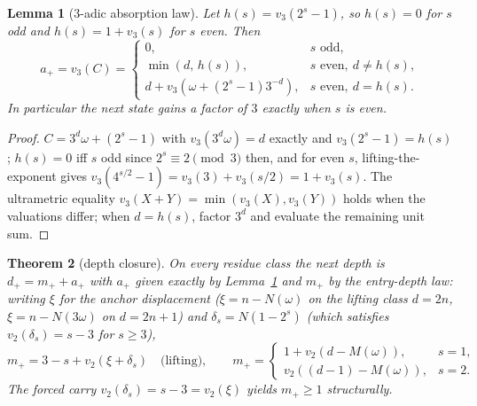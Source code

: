 \documentclass[11pt]{article}
\newtheorem{theorem}{Theorem}[section]
\newtheorem{lemma}[theorem]{Lemma}
\theoremstyle{remark}
\newcommand{\vt}[1]{v_2\!\left(#1\right)}
\newcommand{\vth}[1]{v_3\!\left(#1\right)}
\newcommand{\w}{\omega}
\newcommand{\dnext}{d_{+}}
\begin{document}
\begin{lemma}[$3$-adic absorption law]\label{lem:absorption}
Let $h(s) = \vth{2^s - 1}$, so $h(s) = 0$ for $s$ odd and $h(s) = 1 + \vth{s}$ for $s$ even. Then
\[ a_+ = \vth{C} = \begin{cases} 0, & s \text{ odd},\\[2pt] \min(d,\, h(s)), & s \text{ even},\ d \ne h(s),\\[2pt] d + \vth{\w + (2^s-1)3^{-d}}, & s \text{ even},\ d = h(s). \end{cases} \]
In particular the next state gains a factor of $3$ exactly when $s$ is even.
\end{lemma}

\begin{proof}
$C = 3^d\w + (2^s - 1)$ with $\vth{3^d\w} = d$ exactly and $\vth{2^s-1} = h(s)$; $h(s) = 0$ iff $s$ odd since $2^s \equiv 2 \pmod 3$ then, and for even $s$, lifting-the-exponent gives $\vth{4^{s/2}-1} = \vth{3} + \vth{s/2} = 1 + \vth{s}$. The ultrametric equality $\vth{X+Y} = \min(\vth X,\vth Y)$ holds when the valuations differ; when $d = h(s)$, factor $3^d$ and evaluate the remaining unit sum.
\end{proof}

\begin{theorem}[depth closure]\label{thm:depth}
On every residue class the next depth is $\dnext = m_+ + a_+$ with $a_+$ given exactly by Lemma~\ref{lem:absorption} and $m_+$ by the \emph{entry-depth law}: writing $\xi$ for the anchor displacement ($\xi = n - N(\w)$ on the lifting class $d = 2n$, $\xi = n - N(3\w)$ on $d = 2n+1$) and $\delta_s = N(1 - 2^s)$ (which satisfies $\vt{\delta_s} = s - 3$ for $s \ge 3$),
\[ m_+ = 3 - s + \vt{\xi + \delta_s} \quad\text{(lifting)},\qquad
   m_+ = \begin{cases} 1 + \vt{d - M(\w)}, & s = 1,\\ \vt{(d-1) - M(\w)}, & s = 2. \end{cases} \]
The forced carry $\vt{\delta_s} = s-3 = \vt{\xi}$ yields $m_+ \ge 1$ structurally.
\end{theorem}
\end{document}
